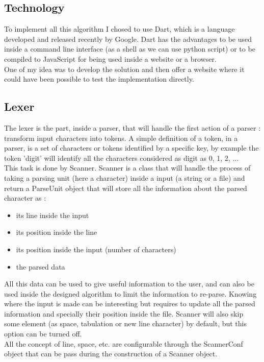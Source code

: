 \subsection{Technology}
To implement all this algorithm I chosed to use Dart, which is a language developed and released recently by Google. Dart has the advantages to be used inside a command line interface (as a shell as we can use python script) or to be compiled to JavaScript for being used inside a website or a browser.\\
One of my idea was to develop the solution and then offer a website where it could have been possible to test the implementation directly.

\subsection{Lexer}
The lexer is the part, inside a parser, that will handle the first action of a parser : transform input characters into tokens. A simple definition of a token, in a parser, is a set of characters or tokens identified by a specific key, by example the token 'digit' will identify all the characters considered as digit as 0, 1, 2, ...\\
This task is done by Scanner. Scanner is a class that will handle the process of taking a parsing unit (here a character) inside a input (a string or a file) and return a ParseUnit object that will store all the information about the parsed character as :
\begin{itemize}
\item its line inside the input
\item its position inside the line
\item its position inside the input (number of characters)
\item the parsed data
\end{itemize}
All this data can be used to give useful information to the user, and can also be used inside the designed algorithm to limit the information to re-parse. Knowing where the input is made can be interesting but requires to update all the parsed information and specially their position inside the file. Scanner will also skip some element (as space, tabulation or new line character) by default, but this option can be turned off.\\
All the concept of line, space, etc. are configurable through the ScannerConf object that can be pass during the construction of a Scanner object.

